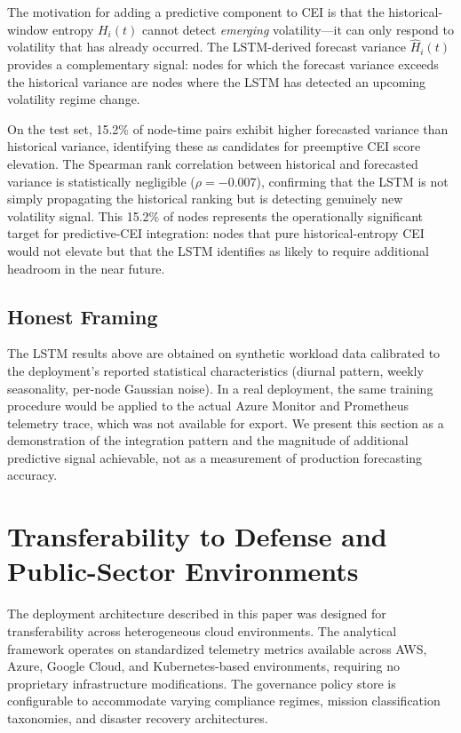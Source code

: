 \documentclass[runningheads]{llncs}
\begin{document}
The motivation for adding a predictive component to CEI is that the historical-window entropy $H_i(t)$ cannot detect \emph{emerging} volatility---it can only respond to volatility that has already occurred. The LSTM-derived forecast variance $\hat{H}_i(t)$ provides a complementary signal: nodes for which the forecast variance exceeds the historical variance are nodes where the LSTM has detected an upcoming volatility regime change.

On the test set, 15.2\% of node-time pairs exhibit higher forecasted variance than historical variance, identifying these as candidates for preemptive CEI score elevation. The Spearman rank correlation between historical and forecasted variance is statistically negligible ($\rho = -0.007$), confirming that the LSTM is not simply propagating the historical ranking but is detecting genuinely new volatility signal. This 15.2\% of nodes represents the operationally significant target for predictive-CEI integration: nodes that pure historical-entropy CEI would not elevate but that the LSTM identifies as likely to require additional headroom in the near future.

\subsection{Honest Framing}

The LSTM results above are obtained on synthetic workload data calibrated to the deployment's reported statistical characteristics (diurnal pattern, weekly seasonality, per-node Gaussian noise). In a real deployment, the same training procedure would be applied to the actual Azure Monitor and Prometheus telemetry trace, which was not available for export. We present this section as a demonstration of the integration pattern and the magnitude of additional predictive signal achievable, not as a measurement of production forecasting accuracy.

\section{Transferability to Defense and Public-Sector Environments}
\label{sec:transferability}

The deployment architecture described in this paper was designed for transferability across heterogeneous cloud environments. The analytical framework operates on standardized telemetry metrics available across AWS, Azure, Google Cloud, and Kubernetes-based environments, requiring no proprietary infrastructure modifications. The governance policy store is configurable to accommodate varying compliance regimes, mission classification taxonomies, and disaster recovery architectures.
\end{document}
